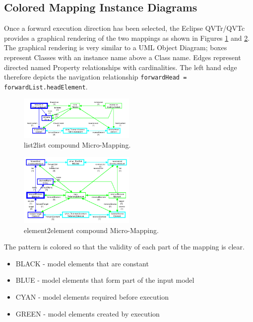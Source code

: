 \documentclass[conference]{IEEEtran}
\begin{document}
\subsection{Colored Mapping Instance Diagrams}

Once a forward execution direction has been selected, the Eclipse QVTr/QVTc provides a graphical rendering of the two mappings as shown in Figures \ref{fig:List2List-QVTs} and \ref{fig:Element2Element-QVTs}. The graphical rendering is very similar to a UML Object Diagram; boxes represent Classes with an instance name above a Class name. Edges represent directed named Property relationships with cardinalities. The left hand edge therefore depicts the navigation relationship \verb|forwardHead = forwardList.headElement|. 

\begin{figure}[h]
	\centering
	\includegraphics[width=0.5\textwidth]{List2List-QVTs.png}
	\caption{list2list compound Micro-Mapping.}
	\label{fig:List2List-QVTs}
\end{figure}

\begin{figure}[h]
	\centering
	\includegraphics[width=0.5\textwidth]{Element2Element-QVTs.png}
	\caption{element2element compound Micro-Mapping.}
	\label{fig:Element2Element-QVTs}
\end{figure}


The pattern is colored so that the validity of each part of the mapping is clear.

\begin{itemize}
\item BLACK - model elements that are constant
\item BLUE - model elements that form part of the input model
\item CYAN - model elements required before execution
\item GREEN - model elements created by execution
\end{itemize} 
\end{document}
